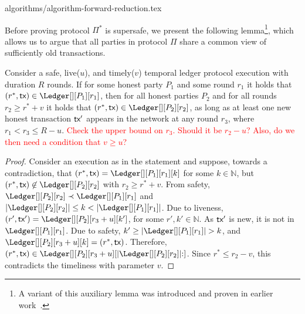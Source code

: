 {algorithms/algorithm-forward-reduction.tex}

Before proving protocol $\Pi^*$ is supersafe, we present
the following lemma\footnote{
  A variant of this auxiliary lemma was introduced and proven in earlier work~\cite{rollerblade}.
}, which allows us to argue that all
parties in protocol $\Pi$ share a common view of sufficiently old transactions.



\begin{lemma}\label{lem:past-perfect}
  Consider a safe, live($u$), and timely($v$) temporal ledger protocol
  execution with duration $R$ rounds.
  If for some honest party $P_1$ and some round $r_1$ it holds that
  $(r^*, \tx) \in \Ledger[][P_1][r_1]$, then
  for all honest parties $P_2$ and for all rounds $r_2 \geq r^* + v$
  it holds that $(r^*, \tx) \in \Ledger[][P_2][r_2]$,
  as long as at least one new honest transaction $\textsf{tx}'$ appears in the
  network at any round $r_3$, where $r_1 < r_3 \leq R - u$.
  \textcolor{red}{Check the upper bound on $r_3$. Should it be $r_2 - u$? Also, do we then need a condition that $v \geq u$?}
\end{lemma}
\begin{proof}
  Consider an execution as in the statement and suppose, towards a contradiction,
  that $(r^*, \tx) = \Ledger[][P_1][r_1][k]$ for some $k \in \mathbb{N}$,
  but $(r^*, \tx) \not\in \Ledger[][P_2][r_2]$
  with $r_2 \geq r^* + v$.
  From safety,
  $\Ledger[][P_2][r_2] \prec \Ledger[][P_1][r_1]$ and
  $|\Ledger[][P_2][r_2]| \leq k < |\Ledger[][P_1][r_1]|$.
  Due to liveness, $(r', \tx') = \Ledger[][P_2][r_3 + u][k']$,
  for some $r', k' \in \mathbb{N}$.
  As $\textsf{tx}'$ is new, it is not in $\Ledger[][P_1][r_1]$.
  Due to safety, $k' \geq |\Ledger[][P_1][r_1]| > k$, and
  $\Ledger[][P_2][r_3 + u][k] = (r^*, \tx)$.
  Therefore,
  $(r^*, \tx) \in \Ledger[][P_2][r_3 + u][|\Ledger[][P_2][r_2]|{:}]$.
  Since $r^* \leq r_2 - v$, this contradicts the timeliness with parameter $v$.\Qed
\end{proof}


